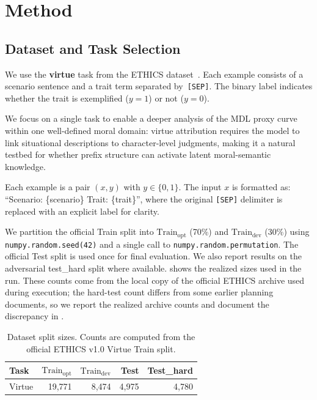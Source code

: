 \documentclass[preprint]{article}
\newcommand{\Trainopt}{\text{Train}_{\text{opt}}}
\newcommand{\Traindev}{\text{Train}_{\text{dev}}}
\begin{document}
\section{Method}
\label{sec:method}

\subsection{Dataset and Task Selection}
\label{sec:dataset}

We use the \textbf{virtue} task from the ETHICS dataset~\citep{hendrycks2021ethics}.
Each example consists of a scenario sentence and a trait term separated by~\texttt{[SEP]}.
The binary label indicates whether the trait is exemplified ($y{=}1$) or not ($y{=}0$).

We focus on a single task to enable a deeper analysis of the MDL proxy curve within one well-defined moral domain: virtue attribution requires the model to link situational descriptions to character-level judgments, making it a natural testbed for whether prefix structure can activate latent moral-semantic knowledge.

Each example is a pair $(x, y)$ with $y \in \{0, 1\}$.
The input $x$ is formatted as: ``Scenario: \{scenario\} Trait: \{trait\}'', where the original \texttt{[SEP]} delimiter is replaced with an explicit label for clarity.

We partition the official Train split into $\Trainopt$ (70\%) and $\Traindev$ (30\%) using \texttt{numpy.random.seed(42)} and a single call to \texttt{numpy.random.permutation}.
The official Test split is used once for final evaluation.
We also report results on the adversarial test\_hard split where available.
 shows the realized sizes used in the run.
These counts come from the local copy of the official ETHICS archive used during execution; the hard-test count differs from some earlier planning documents, so we report the realized archive counts and document the discrepancy in .

\begin{table}[t]
\centering
\caption{Dataset split sizes. Counts are computed from the official ETHICS v1.0 Virtue Train split.}
\label{tab:data_splits}
\small
\begin{tabular}{lrrrr}
\toprule
Task & $\Trainopt$ & $\Traindev$ & Test & Test\_hard \\
\midrule
Virtue & 19,771 & 8,474 & 4,975 & 4,780 \\
\bottomrule
\end{tabular}
\end{table}
\end{document}
